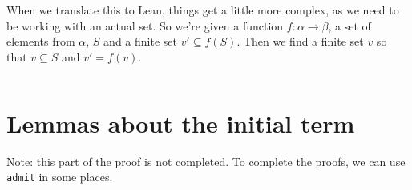 \documentclass[a4paper, 12pt]{article}
\newcommand{\lean}[1]{\texttt{#1}}
\theoremstyle{changedot}
\theoremstyle{changedotbreak}
\theoremstyle{nonumberplain}
\begin{document}
When we translate this to Lean, things get a little more complex, as we need to be working with an actual set. So we're given a function $f : \alpha \to \beta$, a set of elements from $\alpha$, $S$ and a finite set $v' \subseteq f(S)$. Then we find a finite set $v$ so that $v \subseteq S$ and $v' = f(v)$.

\inputminted[firstline=14, lastline=63]{lean}{../src/dickson.lean}

\section{Lemmas about the initial term}\label{app:IN}
Note: this part of the proof is not completed. To complete the proofs, we can use \lean{admit} in some places.
\inputminted[firstline=55]{lean}{../src/initial_term.lean}
\end{document}
